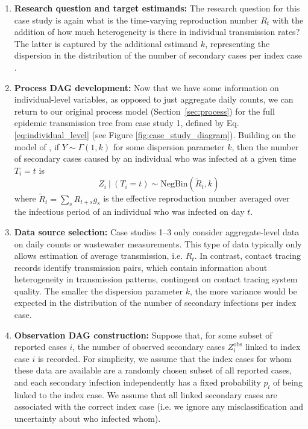 \documentclass{article}
\begin{document}
\begin{enumerate}
   \item \textbf{Research question and target estimands:} The research question for this case study is again what is the time-varying reproduction number $R_t$ with the addition of how much heterogeneity is there in individual transmission rates? The latter is captured by the additional estimand $k$, representing the dispersion in the distribution of the number of secondary cases per index case \citep{lloyd2005superspreading}. 
   
    \item \textbf{Process DAG development:} Now that we have some information on individual-level variables, as opposed to just aggregate daily counts, we can return to our original process model (Section~\ref{sec:process}) for the full epidemic transmission tree from case study 1, defined by Eq. \eqref{eq:individual_level} (see Figure \ref{fig:case_study_diagram}). 
    Building on the model of \citet{lloyd2005superspreading}, if $Y\sim \Gamma(1,k)$ for some dispersion parameter $k$, then the number of secondary cases caused by an individual who was infected at a given time $T_i=t$ is
     \begin{equation} \label{eq:offspring_dist}
        Z_i \ | \ (T_i=t) \sim \mathrm{NegBin}\left( \tilde{R}_{t}, k\right)
    \end{equation}   
    where $\tilde{R}_t= \sum_s R_{t+s} g_s$ is the effective reproduction number averaged over the infectious period of an individual who was infected on day $t$.
   
    \item \textbf{Data source selection:} Case studies 1--3 only consider aggregate-level data on daily counts or wastewater measurements. This type of data typically only allows estimation of average transmission, i.e. $R_t$. In contrast, contact tracing records identify transmission pairs, which contain information about heterogeneity in transmission patterns, contingent on contact tracing system quality. The smaller the dispersion parameter $k$, the more variance would be expected in the distribution of the number of secondary infections per index case.
    
    \item \textbf{Observation DAG construction:} Suppose that, for some subset of reported cases $i$, the number of observed secondary cases $Z^\mathrm{obs}_i$ linked to index case $i$ is recorded. For simplicity, we assume that the index cases for whom these data are available are a randomly chosen subset of all reported cases, and each secondary infection independently has a fixed probability $p_l$ of being linked to the index case. We assume that all linked secondary cases are associated with the correct index case (i.e. we ignore any misclassification and uncertainty about who infected whom). 


\end{enumerate}
\end{document}

